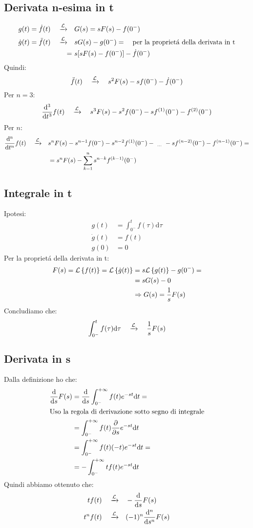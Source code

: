 \documentclass[../main.tex]{subfiles}
\begin{document}
	\subsection{Derivata n-esima in t}
	\label{deriv_n_t}
	\begin{align*}
		g(t)=\dot{f}(t) \quad \xrightarrow{\mathcal{L}} \quad &G(s) = sF(s) - f(0^{-})\\
		\dot{g}(t) = \ddot{f}(t) \quad \xrightarrow{\mathcal{L}} \quad &sG(s) - g(0^{-})= \quad \text{per la propriet\'{a} della derivata in t}\\
		=\ &s[sF(s) - f(0^{-})] - \dot{f}(0^{-})\\
	\end{align*}
	Quindi:
	$$ \ddot{f}(t) \quad \xrightarrow{\mathcal{L}} \quad s^2 F(s) - s f(0^{-}) - \dot{f}(0^{-}) $$
	\linebreak
	Per $n=3$:
	$$ \frac{\mathrm{d^3}}{\mathrm{d}t^3}f(t) \quad \xrightarrow{\mathcal{L}} \quad s^3 F(s) - s^2 f(0^{-}) - s f^{(1)}(0^{-}) - f^{(2)}(0^{-}) $$
	\linebreak
	Per $n$:
	\begin{align*}
		\frac{\mathrm{d^n}}{\mathrm{d}t^n}f(t) \quad \xrightarrow{\mathcal{L}} \quad &s^n F(s) - s^{n-1} f(0^{-}) - s^{n-2} f^{(1)}(0^{-}) -\ _{\dots}\ - s f^{(n-2)}(0^{-}) - f^{(n-1)}(0^{-}) = \\
		&= s^n F(s) - \sum_{k = 1}^{n} s^{n-k} f^{(k - 1)}(0^{-})
	\end{align*}
	\subsection{Integrale in t}
	\label{int_t}
	Ipotesi:
	\begin{align*}
		g(t) &= \int_{0^{-}}^{t} f(\tau) \mathrm{d}\tau\\
		\dot{g}(t) &= f(t)\\
		g(0) &= 0
	\end{align*}
	Per la propriet\'{a} della derivata in t:
	\begin{align*}
		F(s) = \mathcal{L} \left\lbrace f(t) \right\rbrace = \mathcal{L} \left\lbrace \dot{g}(t) \right\rbrace &= s \mathcal{L} \left\lbrace g(t) \right\rbrace - g(0^{-}) = \\
		&= s G(s) - 0\\
		&\Rightarrow G(s) = \frac{1}{s} F(s)
	\end{align*}
	Concludiamo che:
	$$ \int_{0^{-}}^{t} f(\tau) \mathrm{d}\tau \quad \xrightarrow{\mathcal{L}} \quad \frac{1}{s} F(s) $$
	\subsection{Derivata in s}
	\label{deriv_s}
	Dalla definizione ho che:
	\begin{align*}
		\frac{\mathrm{d}}{\mathrm{d}s} F(s) & = \frac{\mathrm{d}}{\mathrm{d}s} \int_{0^{-}}^{+\infty} f(t) e^{- s t} \mathrm{d} t =\\
		\intertext{Uso la regola di derivazione sotto segno di integrale}
		& = \int_{0^{-}}^{+\infty} f(t) \frac{\partial }{\partial s} e^{- s t} \mathrm{d} t\\
		& = \int_{0^{-}}^{+\infty} f(t)(-t) e^{- s t} \mathrm{d} t =\\
		& = - \int_{0^{-}}^{+\infty} t f(t) e^{- s t} \mathrm{d} t
	\end{align*}
	Quindi abbiamo ottenuto che:
	\begin{align*}
		t f(t) \quad \xrightarrow{\mathcal{L}} \quad &- \frac{\mathrm{d}}{\mathrm{d}s} F(s)\\
		t^n f(t) \quad \xrightarrow{\mathcal{L}} \quad &(-1)^n \frac{\mathrm{d}^n}{\mathrm{d}s^n} F(s)
	\end{align*}
\end{document}
